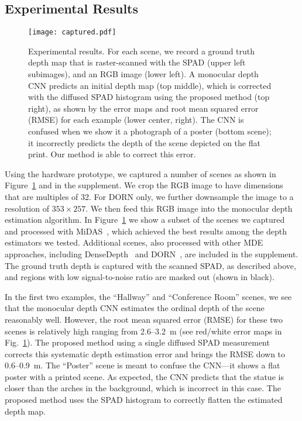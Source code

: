 \subsection{Experimental Results}
\begin{figure}[t]
	\centering
	\texttt{[image: captured.pdf]}
	\caption{Experimental results. For each scene, we record a ground truth depth
    map that is raster-scanned with the SPAD (upper left subimages), and an RGB
    image (lower left). A monocular depth CNN predicts an initial depth map (top
    middle), which is corrected with the diffused SPAD histogram using the
    proposed method (top right), as shown by the error maps and root mean
    squared error (RMSE) for each example (lower center, right). The CNN is
    confused when we show it a photograph of a poster (bottom scene); it
    incorrectly predicts the depth of the scene depicted on the flat print. Our
    method is able to correct this error.}
	\label{fig:results_captured}
\end{figure}

Using the hardware prototype, we captured a number of scenes as shown in
Figure~\ref{fig:results_captured} and in the supplement. We crop the RGB image
to have dimensions that are multiples of 32. For DORN only, we further
downsample the image to a resolution of $353 \times 257$. We then feed this RGB
image into the monocular depth estimation algorithm. In
Figure~\ref{fig:results_captured} we show a subset of the scenes we captured and
processed with MiDAS~\cite{Lasinger:2019}, which achieved the best results among
the depth estimators we tested. Additional scenes, also processed with other MDE
approaches, including DenseDepth~\cite{Alhashim2018} and DORN~\cite{Fu2018}, are
included in the supplement. The ground truth depth is captured with the scanned
SPAD, as described above, and regions with low signal-to-noise ratio are masked
out (shown in black).

In the first two examples, the ``Hallway'' and ``Conference Room'' scenes, we
see that the monocular depth CNN estimates the ordinal depth of the scene
reasonably well. However, the root mean squared error (RMSE) for these two
scenes is relatively high ranging from 2.6--3.2~m (see red/white error maps in
Fig.~\ref{fig:results_captured}). The proposed method using a single diffused
SPAD measurement corrects this systematic depth estimation error and brings the
RMSE down to 0.6--0.9~m. The ``Poster'' scene is meant to confuse the CNN---it
shows a flat poster with a printed scene. As expected, the CNN predicts that the
statue is closer than the arches in the background, which is incorrect in this
case. The proposed method uses the SPAD histogram to correctly flatten the
estimated depth map.




